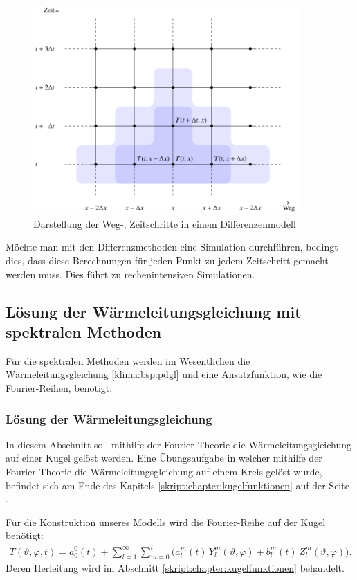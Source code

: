\begin{refsection}
\begin{figure}
\centering
\includegraphics[width=0.9\textwidth]{klima/differenzen.pdf}
\caption{Darstellung der Weg-, Zeitschritte in einem Differenzenmodell
\label{klima:wettervorhersagen:diff}}
\end{figure}

Möchte man mit den Differenzmethoden eine Simulation durchführen, bedingt dies, dass diese Berechnungen für jeden Punkt zu jedem Zeitschritt gemacht werden muss. Dies führt zu rechenintensiven Simulationen.

\subsection{Lösung der Wärmeleitungsgleichung mit spektralen Methoden}
Für die spektralen Methoden werden im Wesentlichen die Wärmeleitungsgleichung \eqref{klima:bsp:pdgl}
und eine Ansatzfunktion, wie die Fourier-Reihen, benötigt.

\subsubsection{Lösung der Wärmeleitungsgleichung}
In diesem Abschnitt soll mithilfe der Fourier-Theorie die Wärmeleitungsgleichung auf einer Kugel gelöst werden. Eine Übungsaufgabe in welcher mithilfe der Fourier-Theorie die  Wärmeleitungsgleichung auf einem Kreis gelöst wurde, befindet sich am Ende des Kapitels \ref{skript:chapter:kugelfunktionen}  auf der Seite \pageref{skript:1101:pdgl}.

Für die Konstruktion unseres Modells wird die Fourier-Reihe auf der Kugel benötigt:
\begin{align}
T(\vartheta ,\varphi ,t)
=
a^0_0(t) + \sum_{l=1}^\infty\sum_{m=0}^l \bigl( a^m_l(t)\,Y^m_l(\vartheta ,\varphi)+b^m_l(t)\,Z^m_l(\vartheta ,\varphi) \bigr).
\label{klima:equation:fourier}
\end{align}
Deren Herleitung wird im Abschnitt \ref{skript:chapter:kugelfunktionen}  behandelt.


\end{refsection}
